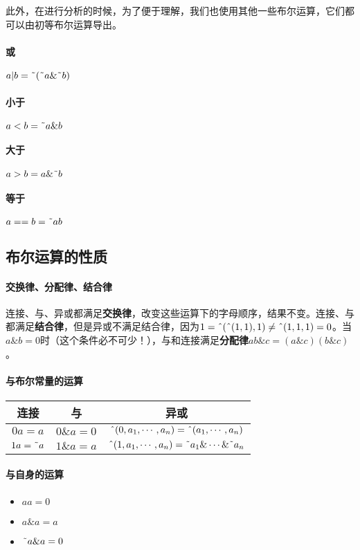 此外，在进行分析的时候，为了便于理解，我们也使用其他一些布尔运算，它们都可以由初等布尔运算导出。
\paragraph*{或}$a|b=\textrm{\~{}}(\textrm{\~{}}a\&\textrm{\~{}}b)$
\paragraph*{小于}$a<b=\textrm{\~{}}a\&b$
\paragraph*{大于}$a>b=a\&\textrm{\~{}}b$
\paragraph*{等于}$a==b=\textrm{\~{}}ab$

\subsection{布尔运算的性质}\label{sec9317}

\paragraph*{交换律、分配律、结合律}

连接、与、异或都满足\textbf{交换律}，改变这些运算下的字母顺序，结果不变。连接、与都满足\textbf{结合律}，但是异或不满足结合律，因为$1=\textrm{\^{}}(\textrm{\^{}}(1,1),1)\ne \textrm{\^{}}(1,1,1)=0$。当$a\&b=0$时（这个条件必不可少！），与和连接满足\textbf{分配律}$ab\&c=(a\&c)(b\&c)$。

\paragraph*{与布尔常量的运算}
\begin{flushleft}
\begin{tabular}{|c|c|c|}
\hline
连接&与&异或\\\hline
$0a=a$&$0\&a=0$&$\textrm{\^{}}(0,a_1,\cdots,a_n)=\textrm{\^{}}(a_1,\cdots,a_n)$\\\hline
$1a=\textrm{\~{}} a$&$1\&a=a$&$\textrm{\^{}}(1,a_1,\cdots,a_n)=\textrm{\~{}} a_1\&\cdots\&\textrm{\~{}} a_n$\\\hline
\end{tabular}
\end{flushleft}

\paragraph*{与自身的运算}
\begin{itemize}
\item $aa=0$
\item $a\& a=a$
\item $\textrm{\~{}} a\& a=0$
\end{itemize}

